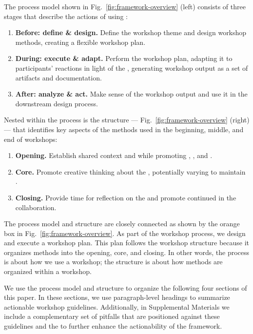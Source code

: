 The process model shown in Fig.~\ref{fig:framework-overview} (left) consists of three stages that describe the actions of using \workshops:
\begin{enumerate}
    \item {\bf Before: define \& design.} Define the workshop theme and design workshop methods, creating a flexible workshop plan.
    \item {\bf During: execute \& adapt.} Perform the workshop plan, adapting it to participants' reactions in light of the \tactics, generating workshop output as a set of artifacts and documentation.
    \item {\bf After: analyze \& act.} Make sense of the workshop output and use it in the downstream design process.
\end{enumerate}

Nested within the process is the \workshop structure --- Fig.~\ref{fig:framework-overview} (right) --- that identifies key aspects of the methods used in the beginning, middle, and end of workshops:
\begin{enumerate}
    \item {\bf Opening.} Establish shared context and \interest while promoting \trust, \agency, and \collegiality.
    \item {\bf Core.} Promote creative thinking about the \topic, potentially varying \challenge to maintain \interest.
    \item {\bf Closing.} Provide time for reflection on the \topic and promote continued \collegiality in the collaboration.
\end{enumerate}

The process model and structure are closely connected as shown by the orange box in Fig.~\ref{fig:framework-overview}. As part of the workshop process, we design and execute a workshop plan. This plan follows the workshop structure because it organizes methods into the opening, core, and closing. In other words, the process is about how we use a workshop; the structure is about how methods are organized within a workshop. 

We use the process model and structure to organize the following four sections of this paper. In these sections, we use paragraph-level headings to summarize \numberOfGuidelines actionable workshop guidelines. Additionally, in Supplemental Materials we include a complementary set of \numberOfPitfalls pitfalls that are positioned against these guidelines and the \tactics to further enhance the actionability of the framework.
